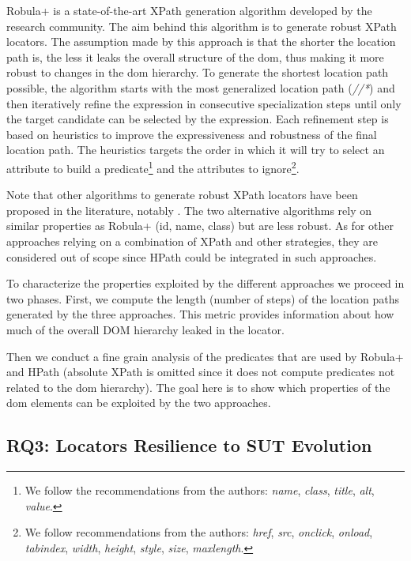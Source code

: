Robula+\cite{Leotta2016} is a state-of-the-art XPath generation algorithm developed by the research community. The aim behind this algorithm is to generate robust XPath locators. The assumption made by this approach is that the shorter the location path is, the less it leaks the overall structure of the \gls{dom}, thus making it more robust to changes in the \gls{dom} hierarchy. To generate the shortest location path possible, the algorithm starts with the most generalized location path (\emph{//*}) and then iteratively refine the expression in consecutive specialization steps until only the target candidate can be selected by the expression. Each refinement step is based on heuristics to improve the expressiveness and robustness of the final location path. The heuristics targets the order in which it will try to select an attribute to build a predicate\footnote{We follow the recommendations from the authors: \emph{name}, \emph{class}, \emph{title}, \emph{alt}, \emph{value}.} and the attributes to ignore\footnote{We follow recommendations from the authors: \emph{href}, \emph{src}, \emph{onclick}, \emph{onload}, \emph{tabindex}, \emph{width}, \emph{height}, \emph{style}, \emph{size}, \emph{maxlength}.}.

Note that other algorithms to generate robust XPath locators have been proposed in the literature, notably \textcite{Montoto2011, Thummalapenta2013}. The two alternative algorithms rely on similar properties as Robula+ (id, name, class) but are less robust\cite{Leotta2016}. As for other approaches relying on a combination of XPath and other strategies\cite{Leotta2015, Aldalur2017}, they are considered out of scope since HPath could be integrated in such approaches.

To characterize the properties exploited by the different approaches we proceed in two phases. First, we compute the length (number of steps) of the location paths generated by the three approaches. This metric provides information about how much of the overall DOM hierarchy leaked in the locator.

Then we conduct a fine grain analysis of the predicates that are used by Robula+ and HPath (absolute XPath is omitted since it does not compute predicates not related to the \gls{dom} hierarchy). The goal here is to show which properties of the \gls{dom} elements can be exploited by the two approaches.

\subsection{RQ3: Locators Resilience to SUT Evolution}
\label{sec:hpath-protocol-rq3}

